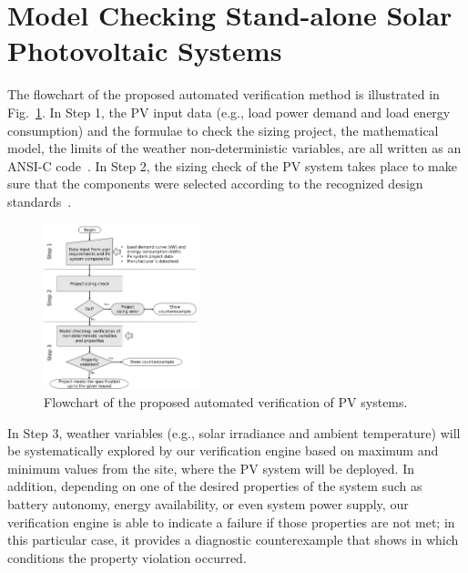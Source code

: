 \documentclass[journal]{IEEEtran}
\begin{document}
\section{Model Checking Stand-alone Solar Photovoltaic Systems }
\label{sec:Methodology}
%
%
%
%
The flowchart of the proposed automated verification method is illustrated in Fig.~\ref{fig:flowchartgeneral}. 
In Step 1, the PV input data (e.g., load power demand and load energy consumption) and the formulae to check the sizing project, the mathematical model, the limits of the weather non-deterministic variables, are all written as an ANSI-C code~\cite{ANSI2018}. In Step 2, the sizing check of the PV system takes place to make sure that the components were selected according to the recognized design standards~\cite{Pinho}.
\begin{figure}[h]
\includegraphics[width=0.4\textwidth]{flowchart_verification5.png}
\centering
\caption{Flowchart of the proposed automated verification of PV systems.}
\label{fig:flowchartgeneral}
\end{figure}
%
In Step 3, weather variables (e.g., solar irradiance and ambient temperature) will be systematically explored by our verification engine based on maximum and minimum values from the site, where the PV system will be deployed. 
In addition, depending on one of the desired properties of the system such as battery autonomy, energy availability, or even system power supply, our verification engine is able to indicate a failure if those properties are not met; in this particular case, it provides a diagnostic counterexample that shows in which conditions the property violation occurred. 
\end{document}
